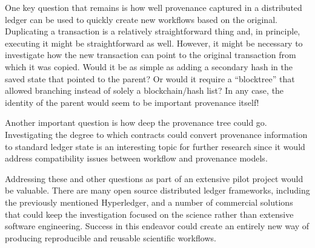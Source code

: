 One key question that remains is how well provenance captured in a distributed
ledger can be used to quickly create new workflows based on the original.
Duplicating a transaction is a relatively straightforward thing and, in
principle, executing it might be straightforward as well. However, it might be
necessary to investigate how the new transaction can point to the original
transaction from which it was copied. Would it be as simple as adding a
secondary hash in the saved state that pointed to the parent? Or would it
require a ``blocktree'' that allowed branching instead of solely a
blockchain/hash list? In any case, the identity of the parent would seem to be
important provenance itself!

Another important question is how deep the provenance tree could go.
Investigating the degree to which contracts could convert provenance information
to standard ledger state is an interesting topic for further research since it
would address compatibility issues between workflow and provenance models.

Addressing these and other questions as part of an extensive pilot project would
be valuable. There are many open source distributed ledger frameworks, including
the previously mentioned Hyperledger, and a number of commercial solutions that
could keep the investigation focused on the science rather than extensive
software engineering. Success in this endeavor could create an entirely new way
of producing reproducible and reusable scientific workflows.